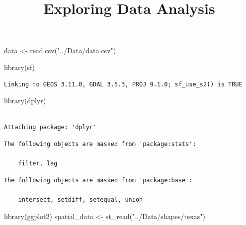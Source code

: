 \documentclass[
  letterpaper,
  DIV=11,
  numbers=noendperiod]{scrartcl}
\title{Exploring Data Analysis}
\author{}
\date{}
\newenvironment{Shaded}{\begin{snugshade}}{\end{snugshade}}
\newcommand{\FunctionTok}[1]{\textcolor[rgb]{0.28,0.35,0.67}{#1}}
\newcommand{\NormalTok}[1]{\textcolor[rgb]{0.00,0.23,0.31}{#1}}
\newcommand{\OtherTok}[1]{\textcolor[rgb]{0.00,0.23,0.31}{#1}}
\newcommand{\StringTok}[1]{\textcolor[rgb]{0.13,0.47,0.30}{#1}}
\begin{document}
\maketitle

\begin{Shaded}
\begin{Highlighting}[]
\NormalTok{data }\OtherTok{\textless{}{-}} \FunctionTok{read.csv}\NormalTok{(}\StringTok{"../Data/data.csv"}\NormalTok{)}
\end{Highlighting}
\end{Shaded}

\begin{Shaded}
\begin{Highlighting}[]
\FunctionTok{library}\NormalTok{(sf)}
\end{Highlighting}
\end{Shaded}

\begin{verbatim}
Linking to GEOS 3.11.0, GDAL 3.5.3, PROJ 9.1.0; sf_use_s2() is TRUE
\end{verbatim}

\begin{Shaded}
\begin{Highlighting}[]
\FunctionTok{library}\NormalTok{(dplyr)}
\end{Highlighting}
\end{Shaded}

\begin{verbatim}

Attaching package: 'dplyr'
\end{verbatim}

\begin{verbatim}
The following objects are masked from 'package:stats':

    filter, lag
\end{verbatim}

\begin{verbatim}
The following objects are masked from 'package:base':

    intersect, setdiff, setequal, union
\end{verbatim}

\begin{Shaded}
\begin{Highlighting}[]
\FunctionTok{library}\NormalTok{(ggplot2)}
\NormalTok{spatial\_data }\OtherTok{\textless{}{-}} \FunctionTok{st\_read}\NormalTok{(}\StringTok{"../Data/shapes/texas"}\NormalTok{)}
\end{Highlighting}
\end{Shaded}
\end{document}
